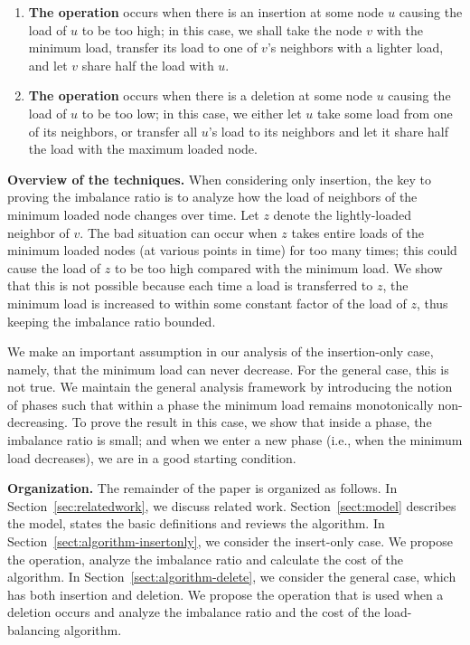 \documentclass[a4paper]{article}
\begin{document}
\begin{enumerate}

\item {\bf The {\minbalance} operation} occurs when there is an
  insertion at some node $u$ causing the load of $u$ to be too high;
  in this case, we shall take the node $v$ with the minimum load, transfer
  its load to one of $v$'s neighbors with a lighter load, and let $v$
  share half the load with $u$.

\item {\bf The {\split} operation} occurs when there is a deletion at
  some node $u$ causing the load of $u$ to be too low; in this case,
  we either let $u$ take some load from one of its neighbors, or
  transfer all $u$'s load to its neighbors and let it share half the
  load with the maximum loaded node.

\end{enumerate}

\textbf{Overview of the techniques.}  When considering only insertion,
the key to proving the imbalance ratio is to analyze how the load of 
neighbors of the minimum loaded node changes over time.  Let $z$
denote the lightly-loaded neighbor of $v$.  The bad situation can occur
when $z$ takes  entire loads of the minimum loaded nodes (at
various points in time) for too many times; this could cause the load
of $z$ to be too high compared with the minimum load.  We show that this
is not possible because  each time a load is transferred to $z$, the
minimum load is increased to within some constant factor of the load
of $z$, thus keeping the imbalance ratio bounded.

We make an important assumption in our analysis of the insertion-only
case, namely, that the minimum load can never decrease.  For the
general case, this is not true.  We maintain the general analysis
framework by introducing the notion of phases such that within a
phase the minimum load remains monotonically non-decreasing.  To prove
the result in this case, we show that inside a phase, the imbalance
ratio is small; and when we enter a new phase (i.e., when the minimum
load decreases), we are in a good starting condition.


\textbf{Organization.} The remainder of the paper is organized
as follows. In Section~\ref{sec:relatedwork}, we discuss related
work. Section~\ref{sect:model} describes the model, states the basic
definitions and reviews the {\adjload} algorithm. In
Section~\ref{sect:algorithm-insertonly}, we consider the insert-only
case. We propose the {\minbalance} operation, analyze the imbalance
ratio and calculate the cost of the algorithm. In
Section~\ref{sect:algorithm-delete}, we consider the general case,
which has both insertion and deletion.  We propose the {\split}
operation that is used when a deletion occurs and analyze the imbalance
ratio and the cost of the load-balancing algorithm.
\end{document}
